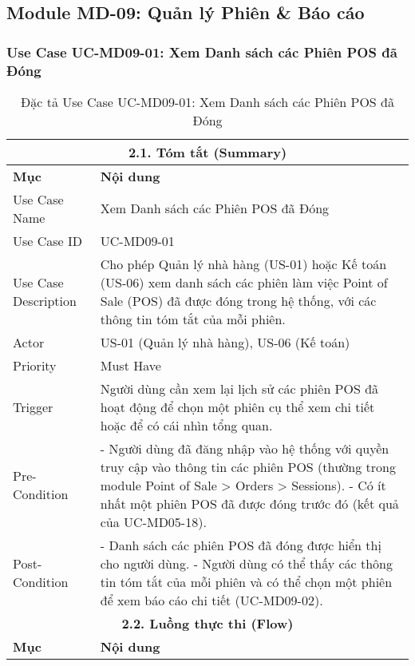 \subsection{Module MD-09: Quản lý Phiên \& Báo cáo}
\subsubsection{Use Case UC-MD09-01: Xem Danh sách các Phiên POS đã Đóng}
\begin{longtable}{|m{4cm}|p{11cm}|}
\caption{Đặc tả Use Case UC-MD09-01: Xem Danh sách các Phiên POS đã Đóng} \label{tab:uc_md09_01_corrected} \\
\hline
\multicolumn{2}{|c|}{\textbf{2.1. Tóm tắt (Summary)}} \\
\hline
\textbf{Mục} & \textbf{Nội dung} \\
\hline
\endhead %
\midrule
\endfoot %
\bottomrule
\endlastfoot %
Use Case Name & Xem Danh sách các Phiên POS đã Đóng \\
\hline
Use Case ID & UC-MD09-01 \\
\hline
Use Case Description & Cho phép Quản lý nhà hàng (US-01) hoặc Kế toán (US-06) xem danh sách các phiên làm việc Point of Sale (POS) đã được đóng trong hệ thống, với các thông tin tóm tắt của mỗi phiên. \\
\hline
Actor & US-01 (Quản lý nhà hàng), US-06 (Kế toán) \\
\hline
Priority & Must Have \\
\hline
Trigger & Người dùng cần xem lại lịch sử các phiên POS đã hoạt động để chọn một phiên cụ thể xem chi tiết hoặc để có cái nhìn tổng quan. \\
\hline
Pre-Condition & - Người dùng đã đăng nhập vào hệ thống với quyền truy cập vào thông tin các phiên POS (thường trong module Point of Sale > Orders > Sessions). \newline - Có ít nhất một phiên POS đã được đóng trước đó (kết quả của UC-MD05-18). \\
\hline
Post-Condition & - Danh sách các phiên POS đã đóng được hiển thị cho người dùng. \newline - Người dùng có thể thấy các thông tin tóm tắt của mỗi phiên và có thể chọn một phiên để xem báo cáo chi tiết (UC-MD09-02). \\
\hline
\multicolumn{2}{|c|}{\textbf{2.2. Luồng thực thi (Flow)}} \\
\hline
\textbf{Mục} & \textbf{Nội dung} \\

\end{longtable}
